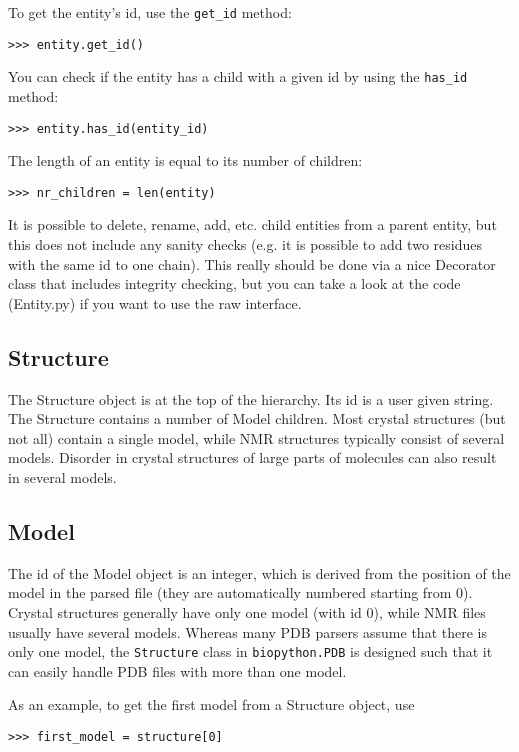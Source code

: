 To get the entity's id, use the \verb+get_id+ method:
\begin{verbatim}
>>> entity.get_id()
\end{verbatim}
You can check if the entity has a child with a given id by using the \verb+has_id+ method:
\begin{verbatim}
>>> entity.has_id(entity_id)
\end{verbatim}
The length of an entity is equal to its number of children:
\begin{verbatim}
>>> nr_children = len(entity)
\end{verbatim}

It is possible to delete, rename, add, etc. child entities from a parent entity,
but this does not include any sanity checks (e.g. it is possible to add two
residues with the same id to one chain). This really should be done via a nice
Decorator class that includes integrity checking, but you can take a look at
the code (Entity.py) if you want to use the raw interface.

\subsection{Structure}

The Structure object is at the top of the hierarchy. Its id is a user given
string. The Structure contains a number of Model children. Most crystal structures
(but not all) contain a single model, while NMR structures typically consist
of several models. Disorder in crystal structures of large parts of molecules
can also result in several models.

\subsection{Model}

The id of the Model object is an integer, which is derived from the position
of the model in the parsed file (they are automatically numbered starting from
0).
Crystal structures generally have only one model (with id 0), while NMR files usually have several models. Whereas many PDB parsers assume that there is only one model, the \verb+Structure+ class in \verb+biopython.PDB+ is designed such that it can easily handle PDB files with more than one model.

As an example, to get the first model from a Structure object, use
\begin{verbatim}
>>> first_model = structure[0]
\end{verbatim}

